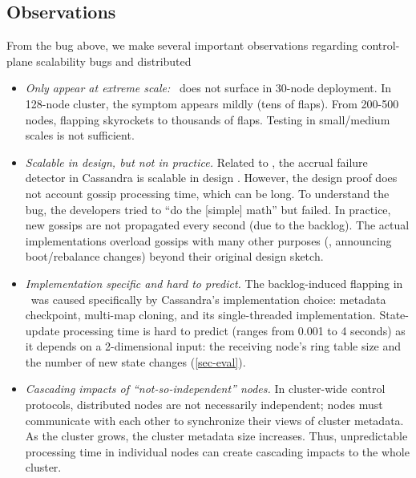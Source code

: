 \subsection{Observations}
\label{sec-scobs}

From the bug above, we make several important observations regarding
control-plane scalability bugs and distributed

\begin{itemize}
\item {\em Only appear at extreme scale:} \caone\ does not surface in 30-node
deployment. In 128-node cluster, the symptom appears mildly (tens of flaps).
From 200-500 nodes, flapping skyrockets to thousands of flaps. Testing in
small/medium scales is not sufficient.

\item {\em Scalable in design, but not in practice.}  Related to \caone, the
accrual failure detector \cite{Hayashibara+04-PhiFailureDetector} in
Cassandra is scalable in design \cite{Lakshman+09-Cassandra}.  However, the
design proof does not account gossip processing time, which can be long. To
understand the bug, the developers tried to ``do the [simple] math''
\cite{CA-One} but failed. In practice, new gossips are not propagated every
second (due to the backlog). The actual implementations overload gossips with
many other purposes (\eg, announcing boot/rebalance changes) beyond their
original design sketch.


\item {\em Implementation specific and hard to predict.}  The
backlog-induced flapping in \caone\ was caused specifically by Cassandra's
implementation choice: metadata checkpoint, multi-map cloning, and its
single-threaded implementation.  State-update processing time is hard to
predict (ranges from 0.001 to 4 seconds) as it depends on a 2-dimensional
input: the receiving node's ring table size and the number of new
state changes (\sec\ref{sec-eval}).

\item {\em Cascading impacts of ``not-so-independent'' nodes.}  In
cluster-wide control protocols, distributed nodes are  not
necessarily independent; nodes must communicate with each other
to synchronize their views of cluster metadata.  As the cluster grows, the
cluster metadata size increases.  Thus, unpredictable processing time in
individual nodes can create cascading impacts to the whole cluster.


\end{itemize}
